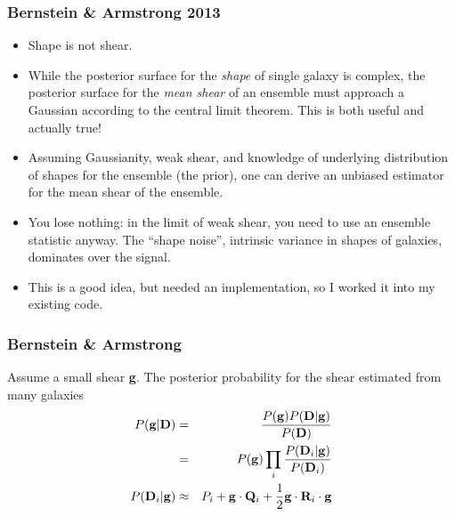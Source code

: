 \documentclass{beamer}
\newcommand{\shear}{{\bf g}}
\begin{document}
\frame
{
    \frametitle{Bernstein \& Armstrong 2013}

    \begin{itemize}

        \item Shape is not shear.
        \item While the posterior surface for the {\it shape} of single galaxy
            is complex, the posterior surface for the {\it mean shear} of an
            ensemble must approach a Gaussian according to the central limit
            theorem.  This is both useful and actually true!

         \item Assuming Gaussianity, weak shear, and knowledge of underlying
             distribution of shapes for the ensemble (the prior), one can
             derive an unbiased estimator for the mean shear of the ensemble.

         \item You lose nothing: in the limit of weak shear, you need
             to use an ensemble statistic anyway.  The ``shape noise'',
             intrinsic variance in shapes of galaxies, dominates over
             the signal.

        \item This is a good idea, but needed an implementation, so I worked it
            into my existing code.
         
    \end{itemize}

}

\frame
{
    \frametitle{Bernstein \& Armstrong}

    Assume a small shear \shear.  The posterior probability for
    the shear estimated from many galaxies
    \begin{eqnarray}
    P(\shear | {\bf D}) & = & \frac{ P(\shear) P({\bf D}|\shear ) }{ P({\bf D}) }  \\
                        & = & P(\shear) \prod_i \frac{ P({\bf D}_i | \shear) }{ P({\bf D}_i) } \\
        P({\bf D}_i | \shear) & \approx & P_i + \shear  \cdot {\bf Q}_i + \frac{1}{2} \shear \cdot {\bf R}_i \cdot \shear
    \end{eqnarray}
}
\end{document}
